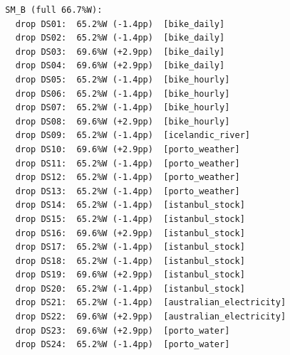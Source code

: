 \begin{verbatim}
  SM_B (full 66.7%W):
    drop DS01:  65.2%W (-1.4pp)  [bike_daily]
    drop DS02:  65.2%W (-1.4pp)  [bike_daily]
    drop DS03:  69.6%W (+2.9pp)  [bike_daily]
    drop DS04:  69.6%W (+2.9pp)  [bike_daily]
    drop DS05:  65.2%W (-1.4pp)  [bike_hourly]
    drop DS06:  65.2%W (-1.4pp)  [bike_hourly]
    drop DS07:  65.2%W (-1.4pp)  [bike_hourly]
    drop DS08:  69.6%W (+2.9pp)  [bike_hourly]
    drop DS09:  65.2%W (-1.4pp)  [icelandic_river]
    drop DS10:  69.6%W (+2.9pp)  [porto_weather]
    drop DS11:  65.2%W (-1.4pp)  [porto_weather]
    drop DS12:  65.2%W (-1.4pp)  [porto_weather]
    drop DS13:  65.2%W (-1.4pp)  [porto_weather]
    drop DS14:  65.2%W (-1.4pp)  [istanbul_stock]
    drop DS15:  65.2%W (-1.4pp)  [istanbul_stock]
    drop DS16:  69.6%W (+2.9pp)  [istanbul_stock]
    drop DS17:  65.2%W (-1.4pp)  [istanbul_stock]
    drop DS18:  65.2%W (-1.4pp)  [istanbul_stock]
    drop DS19:  69.6%W (+2.9pp)  [istanbul_stock]
    drop DS20:  65.2%W (-1.4pp)  [istanbul_stock]
    drop DS21:  65.2%W (-1.4pp)  [australian_electricity]
    drop DS22:  69.6%W (+2.9pp)  [australian_electricity]
    drop DS23:  69.6%W (+2.9pp)  [porto_water]
    drop DS24:  65.2%W (-1.4pp)  [porto_water]

\end{verbatim}
\endgroup
